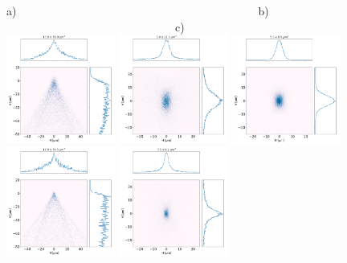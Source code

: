 \documentclass{iucr}              %
\begin{document}
\begin{figure}\label{fig:demagnification}
\flushleft
a)~~~~~~~~~~~~~~~~~~~~~~~~~~~~~~~~~~~~~~~~~~~b)~~~~~~~~~~~~~~~~~~~~~~~~~~~~~~~~~~~~~~~~~~~c)\\
\centering
\includegraphics[width=0.32\textwidth]{figures/M0p2_toroid.png}
\includegraphics[width=0.32\textwidth]{figures/M0p2_parabolic-cone.png}
\includegraphics[width=0.32\textwidth]{figures/M0p2_diaboloid.png}
\includegraphics[width=0.32\textwidth]{figures/M0p1_toroid.png}
\includegraphics[width=0.32\textwidth]{figures/M0p1_parabolic-cone.png}

\end{figure}
\end{document}
